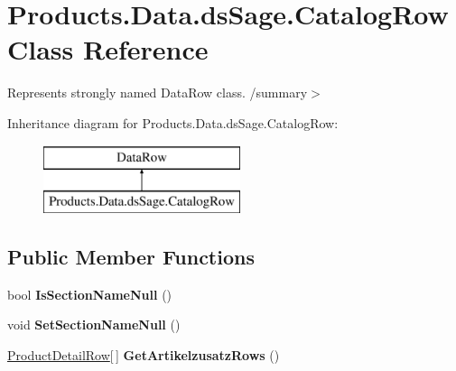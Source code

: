 \hypertarget{class_products_1_1_data_1_1ds_sage_1_1_catalog_row}{}\section{Products.\+Data.\+ds\+Sage.\+Catalog\+Row Class Reference}
\label{class_products_1_1_data_1_1ds_sage_1_1_catalog_row}


Represents strongly named Data\+Row class. /summary$>$  


Inheritance diagram for Products.\+Data.\+ds\+Sage.\+Catalog\+Row\+:\begin{figure}[H]
\begin{center}
\leavevmode
\includegraphics[height=2.000000cm]{class_products_1_1_data_1_1ds_sage_1_1_catalog_row}
\end{center}
\end{figure}
\subsection*{Public Member Functions}
\begin{DoxyCompactItemize}
\item 
bool {\bfseries Is\+Section\+Name\+Null} ()\hypertarget{class_products_1_1_data_1_1ds_sage_1_1_catalog_row_a8c9a4b4707f6daca85107583813cc2b4}{}\label{class_products_1_1_data_1_1ds_sage_1_1_catalog_row_a8c9a4b4707f6daca85107583813cc2b4}

\item 
void {\bfseries Set\+Section\+Name\+Null} ()\hypertarget{class_products_1_1_data_1_1ds_sage_1_1_catalog_row_a56f4696f9e9f4272287651be0185a800}{}\label{class_products_1_1_data_1_1ds_sage_1_1_catalog_row_a56f4696f9e9f4272287651be0185a800}

\item 
\hyperlink{class_products_1_1_data_1_1ds_sage_1_1_product_detail_row}{Product\+Detail\+Row}\mbox{[}$\,$\mbox{]} {\bfseries Get\+Artikelzusatz\+Rows} ()\hypertarget{class_products_1_1_data_1_1ds_sage_1_1_catalog_row_a5d09a6384b9b84536f44c945e11b5482}{}\label{class_products_1_1_data_1_1ds_sage_1_1_catalog_row_a5d09a6384b9b84536f44c945e11b5482}

\end{DoxyCompactItemize}
